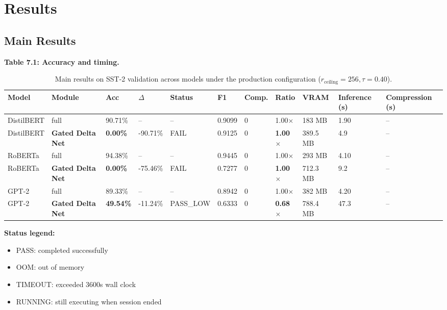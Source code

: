 
\section{Results}

\subsection{Main Results}

\textbf{Table 7.1: Accuracy and timing.}

\begin{table}[t]
\centering
\small
\begin{tabular}{lllllllllll}
\toprule
\textbf{Model} & \textbf{Module} & \textbf{Acc} & \textbf{$\Delta$} & \textbf{Status} & \textbf{F1} & \textbf{Comp.} & \textbf{Ratio} & \textbf{VRAM} & \textbf{Inference (s)} & \textbf{Compression (s)} \\
\midrule
DistilBERT & full & 90.71\% & -- & -- & 0.9099 & 0 & 1.00$\times$ & 183 MB & 1.90 & -- \\
DistilBERT & \textbf{Gated Delta Net} & \textbf{0.00\%} & -90.71\% & FAIL & 0.9125 & 0 & \textbf{1.00$\times$} & 389.5 MB & 4.9 & -- \\
RoBERTa & full & 94.38\% & -- & -- & 0.9445 & 0 & 1.00$\times$ & 293 MB & 4.10 & -- \\
RoBERTa & \textbf{Gated Delta Net} & \textbf{0.00\%} & -75.46\% & FAIL & 0.7277 & 0 & \textbf{1.00$\times$} & 712.3 MB & 9.2 & -- \\
GPT-2 & full & 89.33\% & -- & -- & 0.8942 & 0 & 1.00$\times$ & 382 MB & 4.20 & -- \\
GPT-2 & \textbf{Gated Delta Net} & \textbf{49.54\%} & -11.24\% & PASS\_LOW & 0.6333 & 0 & \textbf{0.68$\times$} & 788.4 MB & 47.3 & -- \\
\bottomrule
\end{tabular}
\caption{Main results on SST-2 validation across models under the production configuration ($r_{\mathrm{ceiling}}=256, \tau=0.40$).}
\label{tab:main_sst2}
\end{table}

\textbf{Status legend:}
\begin{itemize}
\item PASS: completed successfully
\item OOM: out of memory
\item TIMEOUT: exceeded 3600s wall clock
\item RUNNING: still executing when session ended

\end{itemize}
